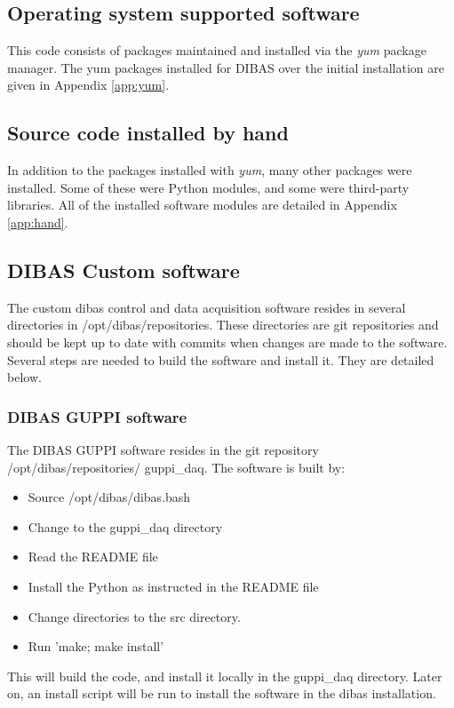 \documentclass[11pt]{article}
\begin{document}
\subsection{Operating system supported software}
This code consists of packages maintained and installed via the
\emph{yum} package manager.  The yum packages installed for DIBAS over
the initial installation are given in Appendix \ref{app:yum}.

\subsection{Source code installed by hand}
In addition to the packages installed with \emph{yum}, many other
packages were installed.  Some of these were Python modules, and some
were third-party libraries.  All of the installed software modules are
detailed in Appendix \ref{app:hand}.

\subsection{DIBAS Custom software}

The custom dibas control and data acquisition software resides in
several directories in /opt/dibas/repositories.  These directories are
git repositories and should be kept up to date with commits when
changes are made to the software.  Several steps are needed to build
the software and install it.  They are detailed below.

\subsubsection{DIBAS GUPPI software}
The DIBAS GUPPI software resides in the git repository
/opt/dibas/repositories/ guppi\_daq.  The software is built by:
\begin{itemize}
\item Source /opt/dibas/dibas.bash
\item Change to the guppi\_daq directory
\item Read the README file
\item Install the Python as instructed in the README file
\item Change directories to the src directory.
\item Run 'make; make install'
\end{itemize}

This will build the code, and install it locally in the guppi\_daq
directory.  Later on, an install script will be run to install the
software in the dibas installation.
\end{document}

